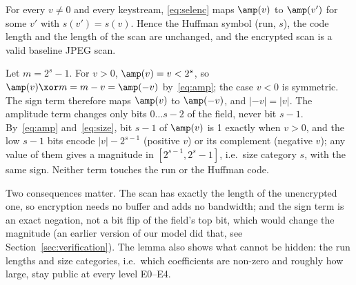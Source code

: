 \begin{lemma}\label{lem:format}
For every $v \ne 0$ and every keystream, \eqref{eq:selenc} maps $\amp(v)$ to $\amp(v')$ for some $v'$ with $s(v') = s(v)$. Hence the Huffman symbol (run, $s$), the code length and the length of the scan are unchanged, and the encrypted scan is a valid baseline JPEG scan.
\end{lemma}
\begin{IEEEproof}
Let $m = 2^s - 1$. For $v > 0$, $\amp(v) = v < 2^s$, so $\amp(v) \xor m = m - v = \amp(-v)$ by~\eqref{eq:amp}; the case $v < 0$ is symmetric. The sign term therefore maps $\amp(v)$ to $\amp(-v)$, and $|{-v}| = |v|$. The amplitude term changes only bits $0 \ldots s-2$ of the field, never bit $s-1$. By~\eqref{eq:amp} and~\eqref{eq:size}, bit $s-1$ of $\amp(v)$ is 1 exactly when $v > 0$, and the low $s-1$ bits encode $|v| - 2^{s-1}$ (positive $v$) or its complement (negative $v$); any value of them gives a magnitude in $[2^{s-1}, 2^s - 1]$, i.e.\ size category $s$, with the same sign. Neither term touches the run or the Huffman code.
\end{IEEEproof}
Two consequences matter. The scan has exactly the length of the unencrypted one, so encryption needs no buffer and adds no bandwidth; and the sign term is an exact negation, not a bit flip of the field's top bit, which would change the magnitude (an earlier version of our model did that, see Section~\ref{sec:verification}). The lemma also shows what cannot be hidden: the run lengths and size categories, i.e.\ which coefficients are non-zero and roughly how large, stay public at every level E0--E4.

